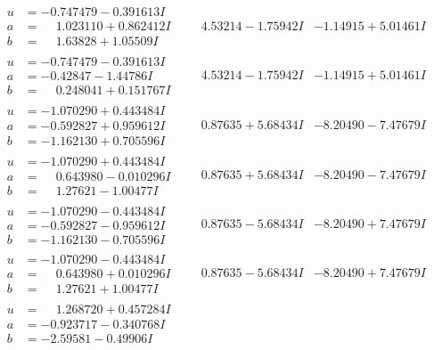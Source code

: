 \documentclass[1p]{elsarticle_modified}
\theoremstyle{definition}
\begin{document}
$$\begin{array}{c|c|c}
\begin{aligned}
u &= -0.747479 - 0.391613 I \\
a &= \phantom{-}1.023110 + 0.862412 I \\
b &= \phantom{-}1.63828 + 1.05509 I\end{aligned}
 & \phantom{-}4.53214 - 1.75942 I & -1.14915 + 5.01461 I \\ \hline\begin{aligned}
u &= -0.747479 - 0.391613 I \\
a &= -0.42847 - 1.44786 I \\
b &= \phantom{-}0.248041 + 0.151767 I\end{aligned}
 & \phantom{-}4.53214 - 1.75942 I & -1.14915 + 5.01461 I \\ \hline\begin{aligned}
u &= -1.070290 + 0.443484 I \\
a &= -0.592827 + 0.959612 I \\
b &= -1.162130 + 0.705596 I\end{aligned}
 & \phantom{-}0.87635 + 5.68434 I & -8.20490 - 7.47679 I \\ \hline\begin{aligned}
u &= -1.070290 + 0.443484 I \\
a &= \phantom{-}0.643980 - 0.010296 I \\
b &= \phantom{-}1.27621 - 1.00477 I\end{aligned}
 & \phantom{-}0.87635 + 5.68434 I & -8.20490 - 7.47679 I \\ \hline\begin{aligned}
u &= -1.070290 - 0.443484 I \\
a &= -0.592827 - 0.959612 I \\
b &= -1.162130 - 0.705596 I\end{aligned}
 & \phantom{-}0.87635 - 5.68434 I & -8.20490 + 7.47679 I \\ \hline\begin{aligned}
u &= -1.070290 - 0.443484 I \\
a &= \phantom{-}0.643980 + 0.010296 I \\
b &= \phantom{-}1.27621 + 1.00477 I\end{aligned}
 & \phantom{-}0.87635 - 5.68434 I & -8.20490 + 7.47679 I \\ \hline\begin{aligned}
u &= \phantom{-}1.268720 + 0.457284 I \\
a &= -0.923717 - 0.340768 I \\
b &= -2.59581 - 0.49906 I\end{aligned}

\end{array}$$
\end{document}
